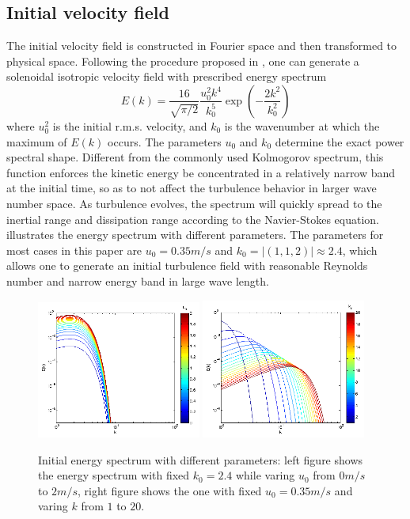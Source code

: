 \documentclass[draft,jgrga]{AGUTeX}
\begin{document}
\begin{article}
\subsection{Initial velocity field}   
The initial velocity field is constructed in Fourier space and then transformed to physical space. Following the procedure proposed in \cite{Rogallo81}, one can generate a solenoidal isotropic velocity field with prescribed energy spectrum \cite{Rosales05}
\begin{equation}
E(k) = \frac{16}{\sqrt{\pi/2}}\frac{u_0^2k^4}{k_0^5}\exp(-\frac{2k^2}{k_0^2})
\end{equation}
where $u_0^2$ is the initial r.m.s. velocity, and $k_0$ is the wavenumber at which the maximum of $E(k)$ occurs. The parameters $u_0$ and $k_0$ determine the exact power spectral shape. Different from the commonly used Kolmogorov spectrum, this function enforces the kinetic energy be concentrated in a relatively narrow band at the initial time, so as to not affect the turbulence behavior in larger wave number space. As turbulence evolves, the spectrum will quickly spread to the inertial range and dissipation range according to the Navier-Stokes equation.  illustrates the energy spectrum with different parameters. The parameters for most cases in this paper are $u_0 = 0.35m/s$ and $k_0 = |(1,1,2)| \approx 2.4$, which allows one to generate an initial turbulence field with reasonable Reynolds number and narrow energy band in large wave length.
\begin{figure}\centering
\includegraphics[width=0.48\textwidth]{Figures/eng_spr_u}
\includegraphics[width=0.48\textwidth]{Figures/eng_spr_k}
\caption{Initial energy spectrum with different parameters: left figure shows the energy spectrum with fixed $k_0 = 2.4$ while varing $u_0$ from $0m/s$ to $2m/s$, right figure shows the one with fixed $u_0 = 0.35m/s$ and varing $k$ from $1$ to $20$.\label{fig:eng_spr}}
\end{figure}


\end{article}
\end{document}
